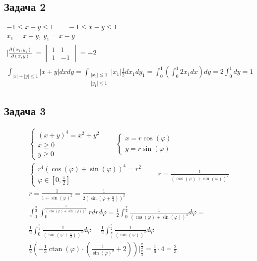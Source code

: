 \subsection*{Задача 2}
	\begin{gather*}
	-1 \leqslant x+y \leqslant 1\qquad -1 \leqslant x-y \leqslant 1\\
	x_1 = x+y,\ y_1 = x-y\\
	\bigg| \frac{\partial(x_1, y_1)}{\partial(x,y)}\bigg| = 
	\begin{vmatrix}
		1 & 1 \\ 1 & -1
	\end{vmatrix}
	=
	-2\\
	\int_{|x| + |y| \leqslant 1} |x + y| dxdy =
	\int_{\substack{|x_1| \leqslant 1 \\ |y_1| \leqslant 1}} |x_1| \frac{1}{2} dx_1 dy_1 =
	\int_{0}^{1} \left(\int_{0}^{1} 2x_1 dx\right) dy =
	2 \int_{0}^{1} dy = 1
	\end{gather*}
\vskip 0.4in


\subsection*{Задача 3}
	\begin{gather*}
	\begin{cases}
		(x+y)^4 = x^2 + y^2\\
		x \geqslant 0\\
		y \geqslant 0
	\end{cases}
	\qquad
	\begin{cases}
		x = r \cos(\varphi)\\
		y = r \sin(\varphi)
	\end{cases}\\
	\begin{cases}
		r^4 (\cos(\varphi) + \sin(\varphi))^4 = r^2\\
		\varphi \in \left[0, \frac{\pi}{2}\right]
	\end{cases}
	\qquad r = \frac{1}{(\cos(\varphi) + \sin(\varphi))^2}\\
	r = \frac{1}{1 + \sin(\varphi)^2} = \frac{1}{2 \left(\sin(\varphi + \frac{\pi}{4})\right)^2}\\
	\int_{0}^{\frac{\pi}{2}} \int_{0}^{\frac{1}{(\cos(\varphi) + \sin(\varphi))^2}} rdr d \varphi =
	\frac{1}{2} \int_{0}^{\frac{\pi}{2}} \frac{1}{(\cos(\varphi) + \sin(\varphi))^4} d \varphi =\\
	\frac{1}{2} \int_{0}^{\frac{\pi}{4}} \frac{1}{\left( \sin(\varphi + \frac{\pi}{4})\right)^4} d \varphi =
	\frac{1}{2} \int_{\frac{\pi}{4}}^{\frac{\pi}{2}} \frac{1}{(\sin(\varphi))^4} d \varphi =\\
	\frac{1}{2} \left(-\frac{1}{3} \operatorname{ctan}(\varphi) \cdot \left(\frac{1}{\sin(\varphi)^2} + 2\right)\right) \bigg|_{\frac{\pi}{4}}^{\frac{\pi}{2}} =
	\frac{1}{6} \cdot 4 = \frac{2}{3}
	\end{gather*}
\vskip 0.4in


